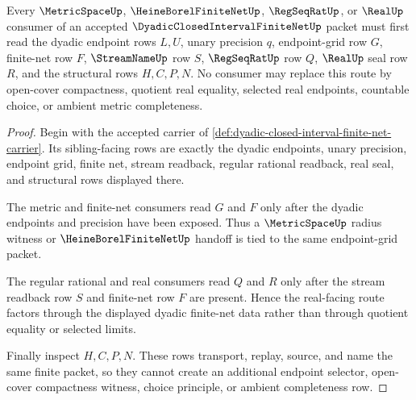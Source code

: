 \begin{theorem}
\label{thm:dyadic-closed-interval-finite-net-sibling-route}
Every $\MetricSpaceUp$, $\HeineBorelFiniteNetUp$, $\RegSeqRatUp$, or $\RealUp$ consumer of an accepted $\DyadicClosedIntervalFiniteNetUp$ packet must first read the dyadic endpoint rows $L,U$, unary precision $q$, endpoint-grid row $G$, finite-net row $F$, $\StreamNameUp$ row $S$, $\RegSeqRatUp$ row $Q$, $\RealUp$ seal row $R$, and the structural rows $H,C,P,N$. No consumer may replace this route by open-cover compactness, quotient real equality, selected real endpoints, countable choice, or ambient metric completeness.
\end{theorem}
\begin{proof}
Begin with the accepted carrier of \autoref{def:dyadic-closed-interval-finite-net-carrier}. Its sibling-facing rows are exactly the dyadic endpoints, unary precision, endpoint grid, finite net, stream readback, regular rational readback, real seal, and structural rows displayed there.

The metric and finite-net consumers read $G$ and $F$ only after the dyadic endpoints and precision have been exposed. Thus a $\MetricSpaceUp$ radius witness or $\HeineBorelFiniteNetUp$ handoff is tied to the same endpoint-grid packet.

The regular rational and real consumers read $Q$ and $R$ only after the stream readback row $S$ and finite-net row $F$ are present. Hence the real-facing route factors through the displayed dyadic finite-net data rather than through quotient equality or selected limits.

Finally inspect $H,C,P,N$. These rows transport, replay, source, and name the same finite packet, so they cannot create an additional endpoint selector, open-cover compactness witness, choice principle, or ambient completeness row.
\end{proof}



